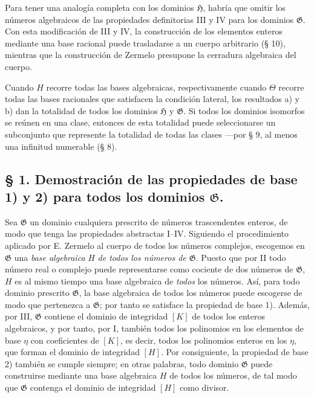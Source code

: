 \documentclass[11pt]{article}
\begin{document}
Para tener una analogía completa con los dominios $\mathfrak H$, habría que omitir los números algebraicos de las propiedades definitorias III y IV para los dominios $\mathfrak G$. Con esta modificación de III y IV, la construcción de los elementos enteros mediante una base racional puede trasladarse a un cuerpo arbitrario (§ 10), mientras que la construcción de Zermelo presupone la cerradura algebraica del cuerpo.

Cuando $H$ recorre todas las bases algebraicas, respectivamente cuando $\Theta$ recorre todas las bases racionales que satisfacen la condición lateral, los resultados a) y b) dan la totalidad de todos los dominios $\mathfrak H$ y $\mathfrak G$. Si todos los dominios isomorfos se reúnen en una clase, entonces de esta totalidad puede seleccionarse un subconjunto que represente la totalidad de todas las clases ---por § 9, al menos una infinitud numerable (§ 8).

\subsection*{§ 1. Demostración de las propiedades de base 1) y 2) para todos los dominios $\mathfrak G$.}

Sea $\mathfrak G$ un dominio cualquiera prescrito de números trascendentes enteros, de modo que tenga las propiedades abstractas I--IV. Siguiendo el procedimiento aplicado por E. Zermelo al cuerpo de todos los números complejos, escogemos en $\mathfrak G$ una \emph{base algebraica} $H$ \emph{de todos los números de $\mathfrak G$}. Puesto que por II todo número real o complejo puede representarse como cociente de dos números de $\mathfrak G$, $H$ es al mismo tiempo una base algebraica de \emph{todos} los números. Así, para todo dominio prescrito $\mathfrak G$, la base algebraica de todos los números puede escogerse de modo que pertenezca a $\mathfrak G$; por tanto se satisface la propiedad de base 1). Además, por III, $\mathfrak G$ contiene el dominio de integridad $[K]$ de todos los enteros algebraicos, y por tanto, por I, también todos los polinomios en los elementos de base $\eta$ con coeficientes de $[K]$, es decir, todos los polinomios enteros en los $\eta$, que forman el dominio de integridad $[H]$. Por consiguiente, la propiedad de base 2) también se cumple siempre; en otras palabras, todo dominio $\mathfrak G$ puede construirse mediante una base algebraica $H$ de todos los números, de tal modo que $\mathfrak G$ contenga el dominio de integridad $[H]$ como divisor.
\end{document}
